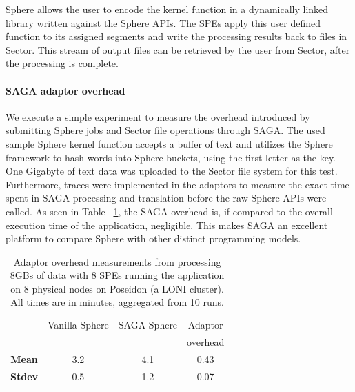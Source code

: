 \documentclass[3p,twocolumn]{elsarticle}
\begin{document}
Sphere allows the user to encode the kernel function in a dynamically
linked library written against the Sphere APIs.  The SPEs apply this
user defined function to its assigned segments and write the
processing results back to files in Sector.  This stream of output
files can be retrieved by the user from Sector, after the processing
is complete.


\paragraph{SAGA adaptor overhead} \label{ssec:overhead}

We execute a simple experiment to measure the overhead introduced by
submitting Sphere jobs and Sector file operations through SAGA.  The
used sample Sphere kernel function accepts a buffer of text and
utilizes the Sphere framework to hash words into Sphere buckets, using
the first letter as the key. One Gigabyte of text data was uploaded to
the Sector file system for this test.  Furthermore, traces were
implemented in the adaptors to measure the exact time spent in SAGA
processing and translation before the raw Sphere APIs were called.  As
seen in Table ~\ref{tab:sphere_overhead}, the SAGA overhead is, if compared
to the overall execution time of the application, negligible.
This makes SAGA an excellent platform to compare Sphere with other distinct
programming models.

\begin{table}[h!]
  \footnotesize
  \begin{tabular}{cccc}
    \hline
    & Vanilla Sphere &  SAGA-Sphere & Adaptor \\
    &                &              & overhead \\
    \hline
    { {\bf Mean}} & 3.2    & 4.1    & 0.43  \\
    \hline
    { {\bf Stdev}} & 0.5    & 1.2    & 0.07   \\
    \hline \hline
  \end{tabular}
  \caption{Adaptor overhead measurements from processing 8GBs of data with 8
  SPEs running the \wc application on 8 physical nodes on Poseidon (a
  LONI cluster).  All times are in minutes, aggregated from 10 runs.
  \label{tab:sphere_overhead}}
\end{table}
\end{document}
